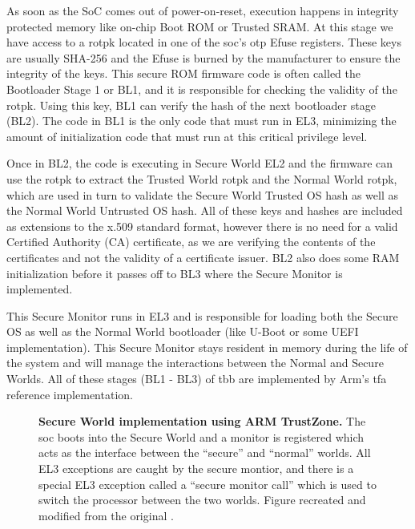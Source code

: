As soon as the SoC comes out of power-on-reset, execution happens in integrity protected memory like on-chip Boot ROM or Trusted SRAM. At this stage we have access to a \gls{rotpk} located in one of the \gls{soc}'s \gls{otp} Efuse registers. These keys are usually SHA-256 and the Efuse is burned by the manufacturer to ensure the integrity of the keys. This secure ROM firmware code is often called the Bootloader Stage 1 or BL1, and it is responsible for checking the validity of the \gls{rotpk}. Using this key, BL1 can verify the hash of the next bootloader stage (BL2). The code in BL1 is the only code that must run in EL3, minimizing the amount of initialization code that must run at this critical privilege level.

Once in BL2, the code is executing in Secure World EL2 and the firmware can use the \gls{rotpk} to extract the Trusted World \gls{rotpk} and the Normal World \gls{rotpk}, which are used in turn to validate the Secure World Trusted OS hash as well as the Normal World Untrusted OS hash. All of these keys and hashes are included as extensions to the x.509 standard format, however there is no need for a valid Certified Authority (CA) certificate, as we are verifying the contents of the certificates and not the validity of a certificate issuer. BL2 also does some RAM initialization before it passes off to BL3 where the Secure Monitor is implemented.

This Secure Monitor runs in EL3 and is responsible for loading both the Secure OS as well as the Normal World bootloader (like U-Boot or some UEFI implementation). This Secure Monitor stays resident in memory during the life of the system and will manage the interactions between the Normal and Secure Worlds. All of these stages (BL1 - BL3) of \gls{tbb} are implemented by Arm's \gls{tfa} reference implementation.

\begin{figure}[ht]
\makebox[\textwidth][c]{
}\caption[Arm TrustZone Example of Normal and Secure World]{\textbf{Secure World implementation using ARM TrustZone.}
The \gls{soc} boots into the Secure World and a monitor is registered which acts as the interface between the ``secure'' and ``normal'' worlds. All EL3 exceptions are caught by the secure montior, and there is a special EL3 exception called a ``secure monitor call'' which is used to switch the processor between the two worlds. Figure recreated and modified from the original \cite{TeschkeSGX}.
\label{fig:tz-overview}}
\end{figure}

